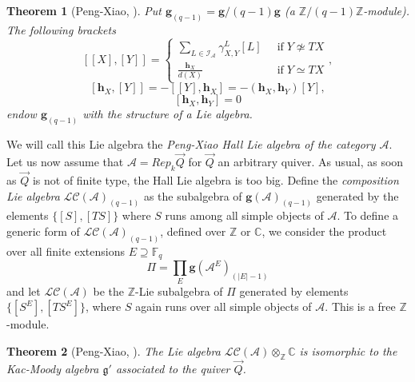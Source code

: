 \documentclass[a4paper,10pt]{amsart}
\def\Z{\mathbb{Z}}
\def\C{\mathbb{C}}
\def\A{\mathcal{A}}
\def\g{\mathfrak{g}}
\newtheorem{theo}{\bf{Theorem}}[section]
\numberwithin{equation}{section}
\begin{document}
{\vspace{.1in}

\begin{theo}[Peng-Xiao, \cite{PX}] Put $\mathbf{g}_{(q-1)}=\mathbf{g}/(q-1)\mathbf{g}$ (a $\Z/(q-1)\Z$-module). The following brackets
$$\left[ [X],[Y] \right]=\begin{cases} \sum_{L \in \mathcal{I}_{\A}} \gamma_{X,Y}^L [L]\;&\;\text{if}\; Y \not\simeq TX\\
\frac{\mathbf{h}_X}{d(X)}\; & \; \text{if}\; Y \simeq TX
\end{cases},$$
$$\left[\mathbf{h}_X,[Y]\right]=-\left[ [Y],\mathbf{h}_X\right]=-(\mathbf{h}_X,\mathbf{h}_Y)[Y],$$
$$[\mathbf{h}_X,\mathbf{h}_Y]=0$$
endow $\mathbf{g}_{(q-1)}$ with the structure of a Lie algebra.
\end{theo}

\vspace{.15in}

We will call this Lie algebra the \textit{Peng-Xiao Hall Lie algebra of the category $\A$}. Let us now assume that $\A=Rep_k\vec{Q}$ for $\vec{Q}$ an arbitrary quiver. As usual, as soon as $\vec{Q}$ is not of finite type, the Hall Lie algebra is too big. Define the \textit{composition Lie algebra} $\mathcal{LC}(\A)_{(q-1)}$ as the subalgebra of $\mathbf{g}(\A)_{(q-1)}$ generated by the elements $\{[S], [TS]\}$ where $S$ runs among all simple objects of $\A$. To define a generic form of $\mathcal{LC}(\A)_{(q-1)}$, defined over $\Z$ or $\C$, we consider the product over all finite extensions
$E \supseteq \mathbb{F}_q$
$$\Pi=\prod_E \mathbf{g}(\A^E)_{(|E|-1)}$$
and let $\mathcal{LC}(\A)$ be the $\Z$-Lie subalgebra of $\Pi$ generated by elements $\{[S^E],[TS^E]\}$, where $S$ again runs over all simple objects of $\A$. This is a free $\Z$-module.

\vspace{.1in}

\begin{theo}[Peng-Xiao, \cite{PX}] The Lie algebra $\mathcal{LC}(\A) \otimes_{\Z} \C$ is isomorphic to the Kac-Moody algebra $\g'$ associated to the quiver $\vec{Q}$.
\end{theo}

\vspace{.2in}

\addtocounter{theo}{1}
}
\end{document}
